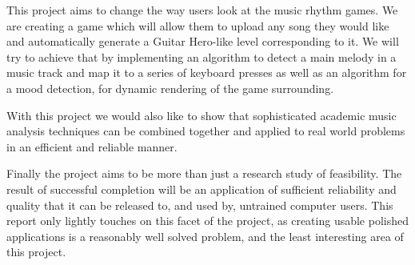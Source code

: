 This project aims to change the way users look at the music rhythm games. We are creating a game which will allow them to upload any song they would like and automatically generate a Guitar Hero-like level corresponding to it. We will try to achieve that by implementing an algorithm to detect a main melody in a music track and map it to a series of keyboard presses as well as an algorithm for a mood detection, for dynamic rendering of the game surrounding.

With this project we would also like to show that sophisticated academic music analysis techniques can be combined together and applied to real world problems in an efficient and reliable manner. 

Finally the project aims to be more than just a research study of feasibility. The result of successful completion will be an application of sufficient reliability and quality that it can be released to, and used by, untrained computer users. This report only lightly touches on this facet of the project, as creating usable polished applications is a reasonably well solved problem, and the least interesting area of this project.

